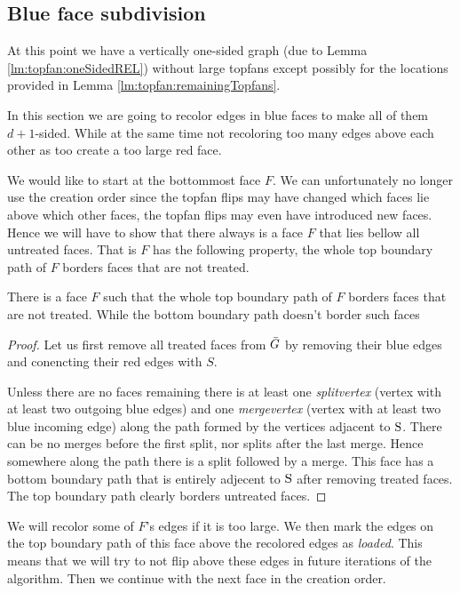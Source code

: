 
\subsection{Blue face subdivision}
\thispagestyle{plain}
\label{ss:subdiv}
  At this point we have a vertically one-sided graph (due to Lemma \ref{lm:topfan:oneSidedREL}) without large topfans except possibly for the locations provided in Lemma \ref{lm:topfan:remainingTopfans}.

  In this section we are going to recolor edges in blue faces to make all of them $d+1$-sided. While at the same time not recoloring too many edges above each other as too create a too large red face.

  We would like to start at the bottommost face $F$. We can unfortunately no longer use the creation order since the topfan flips may have changed which faces lie above which other faces, the topfan flips may even have introduced new faces. Hence we will have to show that there always is a face $F$  that lies bellow all untreated faces. That is $F$ has the following property, the whole top boundary path of $F$ borders faces that are not treated.

  \begin{lemma}
    \label{lm:}
    There is a face $F$ such that the whole top boundary path of $F$ borders faces that are not treated. While the bottom boundary path doesn't border such faces
  \end{lemma}
  \begin{proof}
    Let us first remove all treated faces from $\bar{G}$ by removing their blue edges and conencting their red edges with $S$.

    Unless there are no faces remaining there is at least one \emph{splitvertex} (vertex with at least two outgoing blue edges) and one \emph{mergevertex} (vertex with at least two blue incoming edge) along the path formed by the vertices adjacent to $\mathrm{S}$.
    There can be no merges before the first split, nor splits after the last merge.  Hence somewhere along the path there is a split followed by a merge. This face has a bottom boundary path that is entirely adjecent to $\mathrm{S}$ after removing treated faces. The top boundary path clearly borders untreated faces.
  \end{proof}


  We will recolor some of $F$'s edges if it is too large.
  We then mark the edges on the top boundary path of this face above the recolored edges as \emph{loaded}. This means that we will try to not flip above these edges in future iterations of the algorithm.
  Then we continue with the next face in the creation order.

